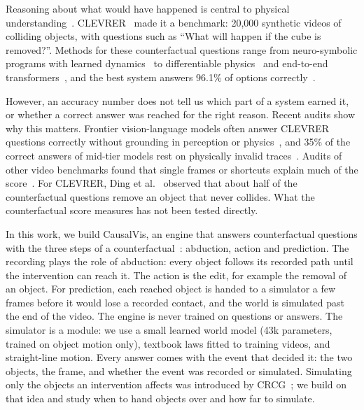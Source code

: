 \documentclass[10pt,twocolumn,letterpaper]{article}
\providecommand{\etal}{et al.}
\newcommand{\sys}{CausalVis}
\begin{document}
Reasoning about what would have happened is central to physical understanding~\cite{battaglia2013simulation,gerstenberg2021csm}.
CLEVRER~\cite{yi2020clevrer} made it a benchmark: 20,000 synthetic videos of colliding objects, with questions such as ``What will happen if the cube is removed?''.
Methods for these counterfactual questions range from neuro-symbolic programs with learned dynamics~\cite{yi2020clevrer,chen2021dcl} to differentiable physics~\cite{ding2021vrdp} and end-to-end transformers~\cite{ding2021aloe}, and the best system answers 96.1\% of options correctly~\cite{ishay2024crcg}.

However, an accuracy number does not tell us which part of a system earned it, or whether a correct answer was reached for the right reason.
Recent audits show why this matters.
Frontier vision-language models often answer CLEVRER questions correctly without grounding in perception or physics~\cite{bagdonaviciute2025physics}, and 35\% of the correct answers of mid-tier models rest on physically invalid traces~\cite{bourigault2026words}.
Audits of other video benchmarks found that single frames or shortcuts explain much of the score~\cite{buch2022revisiting,krojer2025mvp,radsch2026verified}.
For CLEVRER, Ding \etal~\cite{ding2021aloe} observed that about half of the counterfactual questions remove an object that never collides.
What the counterfactual score measures has not been tested directly.

In this work, we build \sys{}, an engine that answers counterfactual questions with the three steps of a counterfactual~\cite{pearl2009causality}: abduction, action and prediction.
The recording plays the role of abduction: every object follows its recorded path until the intervention can reach it.
The action is the edit, for example the removal of an object.
For prediction, each reached object is handed to a simulator a few frames before it would lose a recorded contact, and the world is simulated past the end of the video.
The engine is never trained on questions or answers.
The simulator is a module: we use a small learned world model (43k parameters, trained on object motion only), textbook laws fitted to training videos, and straight-line motion.
Every answer comes with the event that decided it: the two objects, the frame, and whether the event was recorded or simulated.
Simulating only the objects an intervention affects was introduced by CRCG~\cite{ishay2024crcg}; we build on that idea and study when to hand objects over and how far to simulate.
\end{document}
